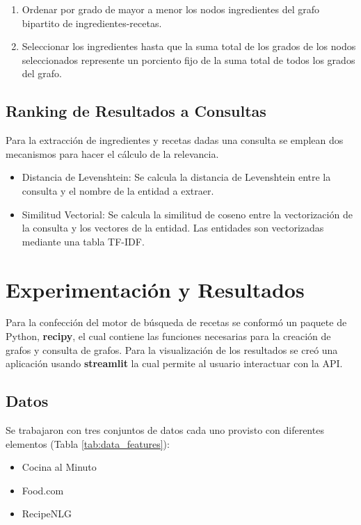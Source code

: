\documentclass[
	a4paper, %
	10pt, %
	unnumberedsections, %
	twoside, %
]{LTJournalArticle}
\begin{document}
\begin{enumerate}
	\item Ordenar por grado de mayor a menor los nodos ingredientes del grafo bipartito de ingredientes-recetas.
	\item Seleccionar los ingredientes hasta que la suma total de los grados de los nodos seleccionados represente
	un porciento fijo de la suma total de todos los grados del grafo.
\end{enumerate}

\subsection{Ranking de Resultados a Consultas}

Para la extracción de ingredientes y recetas dadas una consulta se emplean dos mecanismos para hacer el cálculo
de la relevancia.

\begin{itemize}
	\item Distancia de Levenshtein: Se calcula la distancia de Levenshtein entre la consulta y el nombre de la 
	entidad a extraer.
	\item Similitud Vectorial: Se calcula la similitud de coseno entre la vectorización de la consulta y los
	vectores de la entidad. Las entidades son vectorizadas mediante una tabla TF-IDF. 
\end{itemize}

\section{Experimentación y Resultados}

Para la confección del motor de búsqueda de recetas se conformó un paquete de Python, \textbf{recipy}, el cual
contiene las funciones necesarias para la creación de grafos y consulta de grafos. Para la visualización de los
resultados se creó una aplicación usando \textbf{streamlit} la cual permite al usuario interactuar con la API.

\subsection{Datos}

Se trabajaron con tres conjuntos de datos cada uno provisto con diferentes elementos (Tabla \ref{tab:data_features}):

\begin{itemize}
	\item Cocina al Minuto
	\item Food.com \autocite{majumder2019generating}
	\item RecipeNLG \autocite{bien-etal-2020-recipenlg}
\end{itemize}
\end{document}
